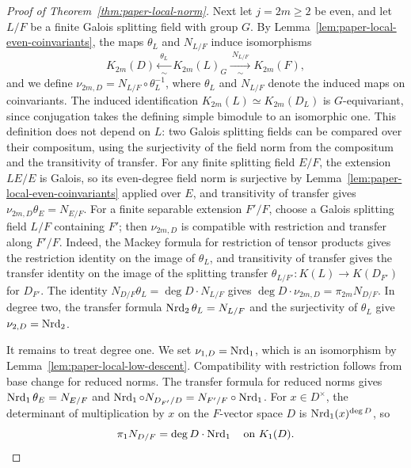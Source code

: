 \begin{proof}[Proof of Theorem~\ref{thm:paper-local-norm}]
Next let $j=2m\ge2$ be even, and let $L/F$ be a finite Galois splitting field with group $G$.
By Lemma~\ref{lem:paper-local-even-coinvariants}, the maps $\theta_L$ and $N_{L/F}$ induce isomorphisms
\[
 K_{2m}(D)\xleftarrow[\ \sim\ ]{\ \theta_L\ }K_{2m}(L)_G\xrightarrow[\ \sim\ ]{\ N_{L/F}\ }K_{2m}(F),
\]
and we define $\nu_{2m,D}=N_{L/F}\circ\theta_L^{-1}$, where $\theta_L$ and $N_{L/F}$ denote the induced maps on coinvariants.
The induced identification $K_{2m}(L)\simeq K_{2m}(D_L)$ is $G$-equivariant, since conjugation takes the defining simple bimodule to an isomorphic one.
This definition does not depend on $L$: two Galois splitting fields can be compared over their compositum, using the surjectivity of the field norm from the compositum and the transitivity of transfer.
For any finite splitting field $E/F$, the extension $LE/E$ is Galois, so its even-degree field norm is surjective by Lemma~\ref{lem:paper-local-even-coinvariants} applied over $E$, and transitivity of transfer gives $\nu_{2m,D}\theta_E=N_{E/F}$.
For a finite separable extension $F'/F$, choose a Galois splitting field $L/F$ containing $F'$; then $\nu_{2m,D}$ is compatible with restriction and transfer along $F'/F$.
Indeed, the Mackey formula for restriction of tensor products gives the restriction identity on the image of $\theta_L$, and transitivity of transfer gives the transfer identity on the image of the splitting transfer $\theta_{L/F'}\colon K(L)\to K(D_{F'})$ for $D_{F'}$.
The identity $N_{D/F}\theta_L=\deg D\cdot N_{L/F}$ gives $\deg D\cdot\nu_{2m,D}=\pi_{2m}N_{D/F}$.
In degree two, the transfer formula $\operatorname{Nrd}_2\theta_L=N_{L/F}$ \cite[Proposition 6.6.1(1)]{KahnLevine2010} and the surjectivity of $\theta_L$ give $\nu_{2,D}=\operatorname{Nrd}_2$.

It remains to treat degree one.
We set $\nu_{1,D}=\operatorname{Nrd}_1$, which is an isomorphism by Lemma~\ref{lem:paper-local-low-descent}.
Compatibility with restriction follows from base change for reduced norms.
The transfer formula for reduced norms \cite[Proposition 6.6.1(1)]{KahnLevine2010} gives $\operatorname{Nrd}_1\theta_E=N_{E/F}$ and $\operatorname{Nrd}_1\circ N_{D_{F'}/D}=N_{F'/F}\circ\operatorname{Nrd}_1$.
For $x\in D^\times$, the determinant of multiplication by $x$ on the $F$-vector space $D$ is $\operatorname{Nrd}_1(x)^{\deg D}$, so
\[
 \pi_1N_{D/F}=\deg D\cdot\operatorname{Nrd}_1\quad\text{on }K_1(D).
\]
\end{proof}
